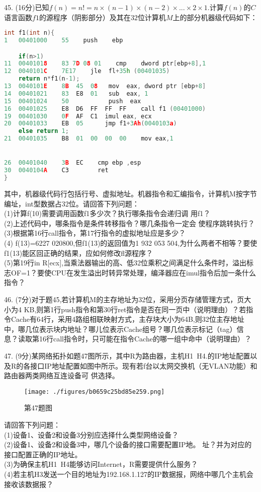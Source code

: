 45. (16分)已知$f(n)=n!=n\times(n-1)\times(n-2)\times...\times2\times1$.计算$f(n)$的$C$语言函数$f1$的源程序（阴影部分）及其在$32$位计算机$M$上的部分机器级代码如下：
\begin{lstlisting}[language=cpp]
int f1(int n){
1   00401000    55    push    ebp

    if(n>1)
11  00401018    83 7D 08 01    cmp    dword ptr[ebp+8],1
12  0040101C    7E17    jle  fl+35h (00401035)
    return n*f1(n-1);
13  0040101E    8B  45  08   mov  eax, dword ptr [ebp+8]
14  00401021    83  E8  01   sub  eax, 1
15  00401024    50           push  eax
16  00401025    E8  D6  FF  FF  FF    call f1 (00401000)
19  00401030    0F  AF  C1  imul eax, ecx
20  00401033    EB  05      jmp f1+3Ah(0040103a)
    else return 1;
21  00401035    B8  01  00  00  00    mov eax,1


26  00401040    3B  EC    cmp ebp ,esp
30  0040104A    C3        ret
}
\end{lstlisting}
其中，机器级代码行包括行号、虚拟地址。机器指令和汇编指令，计算机M按字节编址，int型数据占32位。请回答下列问题： \\
(1)计算f(10)需要调用函数f1多少次？执行哪条指令会递归调
用f1？ \\
(2)上述代码中，哪条指令是条件转移指令？哪几条指令一定会
使程序跳转执行？  \\
(3)根据第16行call指令，第17行指令的虚拟地址应是多少？ \\
(4) f(13)=6227 020800,但f1(13)的返回值为1 932 053 504,为什么两者不相等？要使f1(13)能区回正确的结果，应如何修改fl源程序？ \\
(5)第19行in
R[ecx],当乘法器输出的高、低32位乘积之间满足什么条件时，溢出标志OF=1？要使CPU在发生溢出时转异常处理，编泽器应在imul指令后加一条什么指令？

46. (7分)对于题45,若计算机M的主存地址为32位，采用分页存储管理方式，页大小为4 KB,则第1行push指令和第30行ret指令是否在同一页中（说明理由）？若指令Cache有64行，采用4路组相联映射方式，主存块大小为64B,则32位主存地址中，哪几位表示块内地址？哪儿位表示Cache组号？哪几位表示标记（tag）信息？读取第16行call指令时，只可能在指令Cache的哪一组中命中（说明理由）？

47. (9分)某网络拓扑如题47图所示，其中R为路由器，主机H1~H4.的IP地址配置以及R的各接口IP地址配置如图中所示。现有若f台以太网交换机（无VLAN功能）和路由器两类网络互连设备可
供选择。 \\
\begin{figure}[ht]
\centering
\texttt{[image: ./figures/b0659c25bd85e259.png]}
\caption{第47题图} \label{fig_CSN19_3}
\end{figure}
请回答下列问题： \\
(1)设备1、设备2和设备3分别应选择什么类型网络设备？  \\
(2)设备1、设备2和设备3中，哪几个设备的接口需要配置IP地。
址？并为对应的接口配置正确的IP地址。 \\
(3)为确保主机H1~H4能够访问Internet，R需要提供什么服务？ \\
(4)若主机H3发送一个目的地址为192.168.1.127的IP数据报，网络中哪几个主机会接收该数据报？

